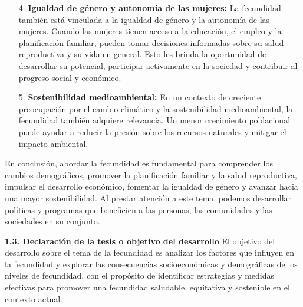 \documentclass[8pt,a4paper]{beamer}
\begin{document}
{\begin{frame}{}
\begin{block}{}
\begin{enumerate}
\item[4.] \textbf{Igualdad de género y autonomía de las mujeres:} La fecundidad también está vinculada a la igualdad de género y la autonomía de las mujeres. Cuando las mujeres tienen acceso a la educación, el empleo y la planificación familiar, pueden tomar decisiones informadas sobre su salud reproductiva y su vida en general. Esto les brinda la oportunidad de desarrollar su potencial, participar activamente en la sociedad y contribuir al progreso social y económico.

\end{enumerate}

\end{block}

\end{frame}


\begin{frame}{}
\begin{block}{}
\setlength{\parskip}{3px}
\justifying

\begin{enumerate}
\setlength{\parskip}{3px}
\justifying
\item[5.] \textbf{Sostenibilidad medioambiental:} En un contexto de creciente preocupación por el cambio climático y la sostenibilidad medioambiental, la fecundidad también adquiere relevancia. Un menor crecimiento poblacional puede ayudar a reducir la presión sobre los recursos naturales y mitigar el impacto ambiental.
\end{enumerate}
En conclusión, abordar la fecundidad es fundamental para comprender los cambios demográficos, promover la planificación familiar y la salud reproductiva, impulsar el desarrollo económico, fomentar la igualdad de género y avanzar hacia una mayor sostenibilidad. Al prestar atención a este tema, podemos desarrollar políticas y programas que beneficien a las personas, las comunidades y las sociedades en su conjunto.
\end{block}

\end{frame}

\begin{frame}{}
\begin{block}{\textbf{1.3. Declaración de la tesis o objetivo del desarrollo}}
\setlength{\parskip}{3px}
\justifying
El objetivo del desarrollo sobre el tema de la fecundidad es analizar los factores que influyen en la fecundidad y explorar las consecuencias socioeconómicas y demográficas de los niveles de fecundidad, con el propósito de identificar estrategias y medidas efectivas para promover una fecundidad saludable, equitativa y sostenible en el contexto actual.
\end{block}
\end{frame}

}
\end{document}
